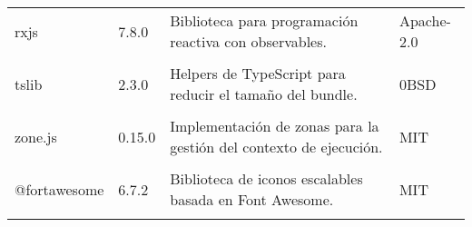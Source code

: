 \begin{longtable}[]{@{}p{}p{}p{}p{}@{}}
    \begin{minipage}[t]{0.18\columnwidth}\raggedright rxjs \end{minipage} & \begin{minipage}[t]{0.10\columnwidth}\raggedright 7.8.0 \end{minipage} & \begin{minipage}[t]{0.49\columnwidth}\raggedright Biblioteca para programación reactiva con observables. \end{minipage} & \begin{minipage}[t]{0.11\columnwidth}\raggedright Apache-2.0 \end{minipage} \\ \tabularnewline

    \begin{minipage}[t]{0.18\columnwidth}\raggedright tslib \end{minipage} & \begin{minipage}[t]{0.10\columnwidth}\raggedright 2.3.0 \end{minipage} & \begin{minipage}[t]{0.49\columnwidth}\raggedright Helpers de TypeScript para reducir el tamaño del bundle. \end{minipage} & \begin{minipage}[t]{0.11\columnwidth}\raggedright 0BSD \end{minipage} \\ \tabularnewline

    \begin{minipage}[t]{0.18\columnwidth}\raggedright zone.js \end{minipage} & \begin{minipage}[t]{0.10\columnwidth}\raggedright 0.15.0 \end{minipage} & \begin{minipage}[t]{0.49\columnwidth}\raggedright Implementación de zonas para la gestión del contexto de ejecución. \end{minipage} & \begin{minipage}[t]{0.11\columnwidth}\raggedright MIT \end{minipage} \\ \tabularnewline

    \begin{minipage}[t]{0.18\columnwidth}\raggedright @fortawesome \end{minipage} & \begin{minipage}[t]{0.10\columnwidth}\raggedright 6.7.2 \end{minipage} & \begin{minipage}[t]{0.49\columnwidth}\raggedright Biblioteca de iconos escalables basada en Font Awesome. \end{minipage} & \begin{minipage}[t]{0.11\columnwidth}\raggedright MIT \end{minipage} \\ \tabularnewline


\end{longtable}
